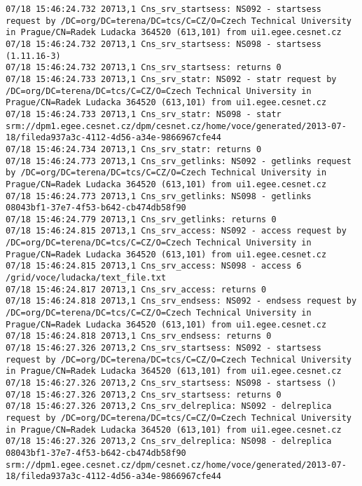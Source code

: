 \documentclass[a4paper, 11pt]{article} %
\begin{document}
\begin{lstlisting}[label={log:del4},caption={lcg-del --vo voce srm://dpm1.egee.cesnet.cz/dpm/cesnet.cz/home/voce/generated/2013-07-18/fileda937a3c-4112-4d56-a34e-9866967cfe44 - deletes the last replica and all its links (2)}]
07/18 15:46:24.732 20713,1 Cns_srv_startsess: NS092 - startsess request by /DC=org/DC=terena/DC=tcs/C=CZ/O=Czech Technical University in Prague/CN=Radek Ludacka 364520 (613,101) from ui1.egee.cesnet.cz
07/18 15:46:24.732 20713,1 Cns_srv_startsess: NS098 - startsess (1.11.16-3)
07/18 15:46:24.732 20713,1 Cns_srv_startsess: returns 0
07/18 15:46:24.733 20713,1 Cns_srv_statr: NS092 - statr request by /DC=org/DC=terena/DC=tcs/C=CZ/O=Czech Technical University in Prague/CN=Radek Ludacka 364520 (613,101) from ui1.egee.cesnet.cz
07/18 15:46:24.733 20713,1 Cns_srv_statr: NS098 - statr srm://dpm1.egee.cesnet.cz/dpm/cesnet.cz/home/voce/generated/2013-07-18/fileda937a3c-4112-4d56-a34e-9866967cfe44
07/18 15:46:24.734 20713,1 Cns_srv_statr: returns 0
07/18 15:46:24.773 20713,1 Cns_srv_getlinks: NS092 - getlinks request by /DC=org/DC=terena/DC=tcs/C=CZ/O=Czech Technical University in Prague/CN=Radek Ludacka 364520 (613,101) from ui1.egee.cesnet.cz
07/18 15:46:24.773 20713,1 Cns_srv_getlinks: NS098 - getlinks  08043bf1-37e7-4f53-b642-cb474db58f90
07/18 15:46:24.779 20713,1 Cns_srv_getlinks: returns 0
07/18 15:46:24.815 20713,1 Cns_srv_access: NS092 - access request by /DC=org/DC=terena/DC=tcs/C=CZ/O=Czech Technical University in Prague/CN=Radek Ludacka 364520 (613,101) from ui1.egee.cesnet.cz
07/18 15:46:24.815 20713,1 Cns_srv_access: NS098 - access 6 /grid/voce/ludacka/text_file.txt
07/18 15:46:24.817 20713,1 Cns_srv_access: returns 0
07/18 15:46:24.818 20713,1 Cns_srv_endsess: NS092 - endsess request by /DC=org/DC=terena/DC=tcs/C=CZ/O=Czech Technical University in Prague/CN=Radek Ludacka 364520 (613,101) from ui1.egee.cesnet.cz
07/18 15:46:24.818 20713,1 Cns_srv_endsess: returns 0
07/18 15:46:27.326 20713,2 Cns_srv_startsess: NS092 - startsess request by /DC=org/DC=terena/DC=tcs/C=CZ/O=Czech Technical University in Prague/CN=Radek Ludacka 364520 (613,101) from ui1.egee.cesnet.cz
07/18 15:46:27.326 20713,2 Cns_srv_startsess: NS098 - startsess ()
07/18 15:46:27.326 20713,2 Cns_srv_startsess: returns 0
07/18 15:46:27.326 20713,2 Cns_srv_delreplica: NS092 - delreplica request by /DC=org/DC=terena/DC=tcs/C=CZ/O=Czech Technical University in Prague/CN=Radek Ludacka 364520 (613,101) from ui1.egee.cesnet.cz
07/18 15:46:27.326 20713,2 Cns_srv_delreplica: NS098 - delreplica 08043bf1-37e7-4f53-b642-cb474db58f90 srm://dpm1.egee.cesnet.cz/dpm/cesnet.cz/home/voce/generated/2013-07-18/fileda937a3c-4112-4d56-a34e-9866967cfe44

\end{lstlisting}
\end{document}
